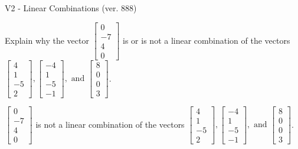 \begin{exercise}
  \begin{exerciseTitle}V2 - Linear Combinations (ver. 888)\end{exerciseTitle}
  \begin{exerciseStatement}
    Explain why the vector \(\left[\begin{array}{c}
0 \\
-7 \\
4 \\
0
\end{array}\right]\)  is or is not a linear 
	combination of the vectors \(\left[\begin{array}{c}
4 \\
1 \\
-5 \\
2
\end{array}\right] , \left[\begin{array}{c}
-4 \\
1 \\
-5 \\
-1
\end{array}\right] , \text{ and } \left[\begin{array}{c}
8 \\
0 \\
0 \\
3
\end{array}\right]\).
	


  \end{exerciseStatement}
  \begin{exerciseAnswer}
   \(\left[\begin{array}{c}
0 \\
-7 \\
4 \\
0
\end{array}\right]\) 
  	 is not  
	a linear combination of the vectors \(\left[\begin{array}{c}
4 \\
1 \\
-5 \\
2
\end{array}\right] , \left[\begin{array}{c}
-4 \\
1 \\
-5 \\
-1
\end{array}\right] , \text{ and } \left[\begin{array}{c}
8 \\
0 \\
0 \\
3
\end{array}\right]\).

	
  


  \end{exerciseAnswer}
\end{exercise}